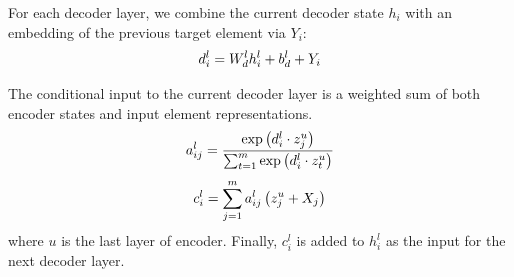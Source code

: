 For each decoder layer, 
we combine the current decoder state $h_{i}$
with an embedding of the previous target element via $Y_{i}$:
\begin{equation}
\small
    d _ { i } ^ { l } = W _ { d } ^ { l } h _ { i } ^ { l } + b _ { d } ^ { l } + Y _ { i }
\end{equation}

The conditional input to the current 
decoder layer is a weighted sum of both encoder states and input element representations.
\begin{equation}\label{eq:a}
\small
    a _ { i j } ^ { l } = \frac { \exp \left( d _ { i } ^ { l } \cdot z _ { j } ^ { u } \right) } { \sum _ { t = 1 } ^ { m } \exp \left( d _ { i } ^ { l } \cdot z _ { t } ^ { u } \right) }
\end{equation}
\begin{equation}\label{eq:c}
\small
    c _ { i } ^ { l } = \sum _ { j = 1 } ^ { m } a _ { i j } ^ { l } \left( z _ { j } ^ { u } + X_j \right)
\end{equation}
where $u$ is the last layer of encoder.  
Finally, $c _ { i } ^ { l }$ is added to $h_{i}^{l}$ as the input for the next decoder layer.

